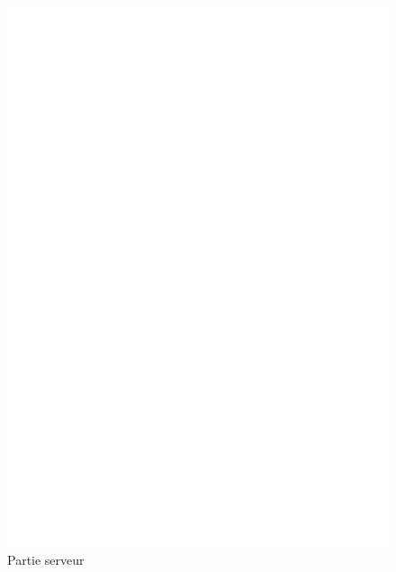  \begin{figure}[htb]
   \centering
   \includegraphics[scale=.5]{img/ia.eps}
   \caption{Partie serveur}
   \label{fig:ia}
 \end{figure}
\clearpage
